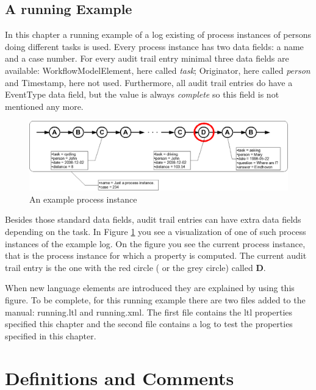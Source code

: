 \subsection{A running Example}
\label{language:example}

In this chapter a running example of a log existing of process
instances of persons doing different tasks is used. Every process instance has two
data fields: a name and a case number. For every audit trail entry minimal
three data fields are available: WorkflowModelElement, here called
\textit{task};
Originator, here called \textit{person} and Timestamp, here not used. Furthermore, all audit trail entries do have a EventType data
field, but the value is always \textit{complete} so this
field is not mentioned any more. 

\begin{figure}[H]
    \includegraphics[scale=0.30]{diagrams/current-process-instance.eps}
    \caption{An example process instance}
    \label{language:pi01}
\end{figure}

Besides those standard data fields, audit trail entries can have extra data
fields depending on the task. In Figure \ref{language:pi01} you see a
visualization of one of such process instances of the example log. On the
figure you see the current process instance, that is the process instance for
which a property is computed. The current audit trail entry is the one with
the red circle ( or the grey circle) called \textbf{D}.

When new language elements are introduced they are explained by using this
figure. To be complete, for this running example there are two files added to
the manual: running.ltl and running.xml. The first file contains the ltl
properties specified this chapter and the second file contains a log to test
the properties specified in this chapter.

\section{Definitions and Comments}
\label{language:definitions}

